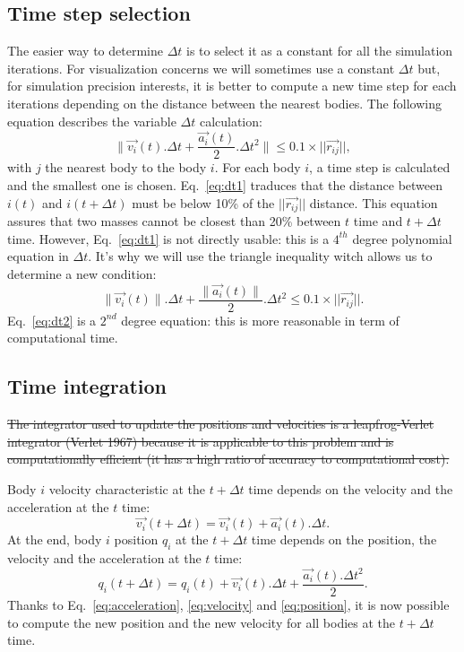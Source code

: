 \subsection{Time step selection}
The easier way to determine $\Delta t$ is to select it as a constant for all the simulation iterations.
For visualization concerns we will sometimes use a constant $\Delta t$ but, for simulation precision interests, it is better to compute a new time step for each iterations depending on the distance between the nearest bodies.
The following equation describes the variable $\Delta t$ calculation:
\begin{equation}
\label{eq:dt1}
	\|\vec{v_i}(t) . \Delta t + \frac{\vec{a_i}(t)}{2} . \Delta t^2 \| \leq 0.1 \times ||\vec{r_{ij}}||,
\end{equation}
with $j$ the nearest body to the body $i$.
For each body $i$, a time step is calculated and the smallest one is chosen.
Eq.~\ref{eq:dt1} traduces that the distance between $i(t)$ and $i(t + \Delta t)$ must be below 10\% of the $||\vec{r_{ij}}||$ distance.
This equation assures that two masses cannot be closest than 20\% between $t$ time and $t + \Delta t$ time.
However, Eq.~\ref{eq:dt1} is not directly usable: this is a $4^{th}$ degree polynomial equation in $\Delta t$.
It's why we will use the triangle inequality witch allows us to determine a new condition:
\begin{equation}
\label{eq:dt2}
	\|\vec{v_i}(t)\| . \Delta t + \frac{\|\vec{a_i}(t)\|}{2} . \Delta t^2  \leq 0.1 \times ||\vec{r_{ij}}||.
\end{equation}
Eq.~\ref{eq:dt2} is a $2^{nd}$ degree equation: this is more reasonable in term of computational time.

\subsection{Time integration}
\sout{The integrator used to update the positions and velocities is a leapfrog-Verlet integrator (Verlet 1967) because it is applicable to this problem and is computationally efficient (it has a high ratio of accuracy to computational cost).}

Body $i$ velocity characteristic at the $t + \Delta t$ time depends on the velocity and the acceleration at the $t$ time:
\begin{equation}
\label{eq:velocity}
	\vec{v_i}(t + \Delta t) = \vec{v_{i}}(t) + \vec{a_i}(t) . \Delta t.
\end{equation}
At the end, body $i$ position $q_i$ at the $t + \Delta t$ time depends on the position, the velocity and the acceleration at the $t$ time:
\begin{equation}
\label{eq:position}
	q_i(t + \Delta t) = q_{i}(t) + \vec{v_{i}}(t) . \Delta t + \frac{\vec{a_i}(t) . \Delta t^2}{2}.
\end{equation}
Thanks to Eq.~\ref{eq:acceleration}, \ref{eq:velocity} and \ref{eq:position}, it is now possible to compute the new position and the new velocity for all bodies at the $t + \Delta t$ time.
